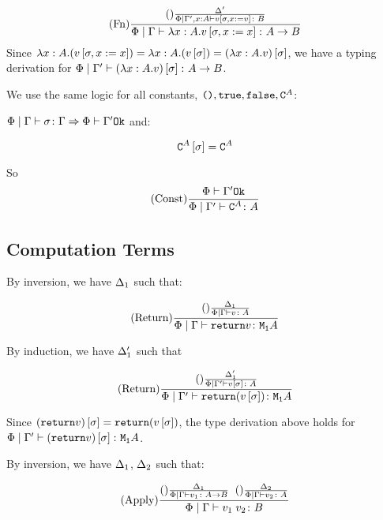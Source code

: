{        \begin{equation}
            (\text{Fn}) \frac{
                (\text{}) \frac{\Delta'}{\Phi\mid\Gamma', x:A  \vdash v\left[\sigma, x:= v\right] \colon B}
            }{\Phi\mid\Gamma \vdash \lambda x : A. v\left[\sigma, x:={x}\right] \colon A\rightarrow B}
        \end{equation} 
        Since $\lambda x : A. (v\left[\sigma, x:={x}\right]) = {\lambda x : A. ({v\left[\sigma\right]})} = (\lambda x : A. v)\left[\sigma\right]$, we have a typing derivation for $\Phi\mid\Gamma' \vdash (\lambda x : A. v)\left[\sigma\right] \colon A\rightarrow B$.

        We use the same logic for all constants, $\texttt{()},\texttt{true},\texttt{false},\texttt{C}^{A}$:

        $\Phi\mid\Gamma \vdash \sigma \colon \Gamma \Rightarrow \Phi\vdash \Gamma' \texttt{Ok}$ and:

        \begin{equation}
            \texttt{C}^{A}\left[\sigma\right] =\texttt{C}^{A}
        \end{equation}

        So \begin{equation}
            (\text{Const}) \frac{\Phi\vdash \Gamma' \texttt{Ok}}{\Phi\mid\Gamma' \vdash \texttt{C}^{A} \colon A}
        \end{equation}
    \subsection{Computation Terms}
        By inversion, we have $\Delta_1$ such that:

        \begin{equation}
            (\text{Return}) \frac{(\text{}) \frac{\Delta_1}{\Phi\mid\Gamma \vdash v \colon A}}{\Phi\mid\Gamma \vdash \texttt{return} v \colon \texttt{M}_{\texttt{1}}{A}}
        \end{equation}

        By induction, we have $\Delta_1'$ such that

        \begin{equation}
            (\text{Return}) \frac{(\text{}) \frac{\Delta'_1}{\Phi\mid\Gamma' \vdash v\left[\sigma\right] \colon A}}{\Phi\mid\Gamma' \vdash \texttt{return} (v\left[\sigma\right]) \colon \texttt{M}_{\texttt{1}}{A}}
        \end{equation}

        Since $(\texttt{return} v)\left[\sigma\right] = \texttt{return} (v\left[\sigma\right])$, the type derivation above holds for $\Phi\mid\Gamma' \vdash (\texttt{return} v)\left[\sigma\right] \colon \texttt{M}_{\texttt{1}}{A}$.

        By inversion, we have $\Delta_1$, $\Delta_2$ such that:

        \begin{equation}
            (\text{Apply}) \frac{
                (\text{}) \frac{\Delta_1}{\Phi\mid\Gamma \vdash v_1 \colon A\rightarrow B}
                \;\;
                (\text{}) \frac{\Delta_2}{\Phi\mid\Gamma \vdash v_2 \colon A}
            }{\Phi\mid\Gamma \vdash v_1\; v_2 \colon B}
        \end{equation}

}
